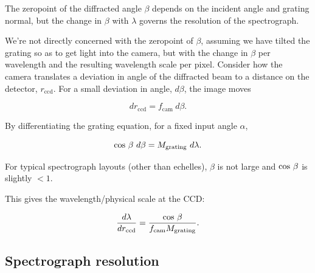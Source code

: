 \documentclass[12pt]{article}
\begin{document}
The zeropoint of the diffracted
angle $\beta$ depends on the incident angle and grating normal, 
but the change in $\beta$ with $\lambda$ governs the resolution of 
the spectrograph.  


We're not directly concerned with the zeropoint of $\beta$, assuming
we have tilted the grating so as to get light into the camera,
but with the change in $\beta$ per wavelength and the resulting
wavelength scale per pixel.
Consider how the camera translates a deviation in angle of the
diffracted beam to a distance on the detector, $r_{\mathrm{ccd}}$.  
For a small deviation in angle, $d\beta$, the image moves

$$  dr_{\mathrm{ccd}} = f_{\mathrm{cam}}~ d\beta. $$

By differentiating the grating equation, for a fixed 
input angle $\alpha$, 

$$ {\rm cos}~\beta~d\beta = M_{\mathrm{grating}}~d\lambda.$$

For typical spectrograph layouts (other than echelles), $\beta$
is not large and ${\rm cos}\ \beta$ is slightly $<1$.


This gives the wavelength/physical scale at the CCD:

$$  \frac{d\lambda}{dr_{\mathrm{ccd}}} = \frac{{\rm cos}~\beta}{f_{\mathrm{cam}}  M_{\mathrm{grating}}}. $$


\subsection{Spectrograph resolution}
\end{document}
